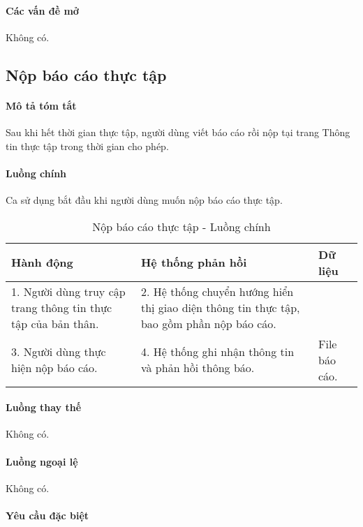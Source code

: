 \documentclass[./../main.tex]{subfiles}
\begin{document}
\paragraph*{Các vấn đề mở}

Không có.

\subsection{Nộp báo cáo thực tập}

\paragraph*{Mô tả tóm tắt}

Sau khi hết thời gian thực tập, người dùng viết báo cáo rồi nộp tại trang Thông tin thực tập trong thời gian cho phép.

\paragraph*{Luồng chính} Ca sử dụng bắt đầu khi người dùng muốn nộp báo cáo thực tập.

\begin{table}[H]
  \caption{Nộp báo cáo thực tập - Luồng chính}
  \label{tab:upload_report}
  \begin{tabularx}{\textwidth}{|X|X|X|}
  \hline
  \textbf{Hành động} &
  \textbf{Hệ thống phản hồi} &
  \textbf{Dữ liệu} \\ \hline
  1. Người dùng truy cập trang thông tin thực tập của bản thân. &
  2. Hệ thống chuyển hướng hiển thị giao diện thông tin thực tập, bao gồm phần nộp báo cáo. &
   \\ \hline
  3. Người dùng thực hiện nộp báo cáo. &
  4. Hệ thống ghi nhận thông tin và phản hồi thông báo. & 
  File báo cáo. \\ \hline
  \end{tabularx}
\end{table}

\paragraph*{Luồng thay thế} Không có.

\paragraph*{Luồng ngoại lệ} Không có.

\paragraph*{Yêu cầu đặc biệt}
\end{document}
